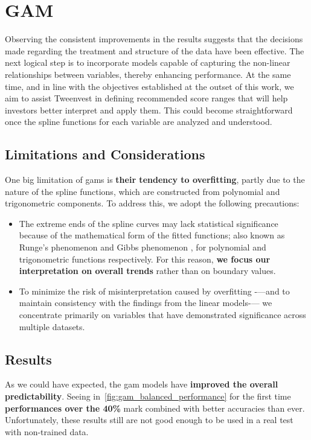 \documentclass[11pt,english,a4paper,hidelinks]{book}
\begin{document}

\section{GAM}

Observing the consistent improvements in the results suggests that the decisions made regarding the treatment and structure of the data have been effective. The next logical step is to incorporate models capable of capturing the non-linear relationships between variables, thereby enhancing performance. At the same time, and in line with the objectives established at the outset of this work, we aim to assist Tweenvest in defining recommended score ranges that will help investors better interpret and apply them. This could become straightforward once the spline functions for each variable are analyzed and understood.

\subsection{Limitations and Considerations}

\noindent One big limitation of \acrshort{gam}s is \textbf{their tendency to overfitting}, partly due to the nature of the spline functions, which are constructed from polynomial and trigonometric components. To address this, we adopt the following precautions:
\begin{itemize}
    \item The extreme ends of the spline curves may lack statistical significance because of the mathematical form of the fitted functions; also known as Runge's phenomenon \cite{runge1901empirische} and Gibbs phenomenon \cite{carslaw1930fourier}, for polynomial and trigonometric functions respectively. For this reason, \textbf{we focus our interpretation on overall trends} rather than on boundary values.
    \item To minimize the risk of misinterpretation caused by overfitting -—and to maintain consistency with the findings from the linear models-— we concentrate primarily on variables that have demonstrated significance across multiple datasets.
\end{itemize}

\subsection{Results}

\noindent As we could have expected, the \acrshort{gam} models have \textbf{improved the overall predictability}. Seeing in~\ref{fig:gam_balanced_performance} for the first time \textbf{performances over the 40\%} mark combined with better accuracies than ever. Unfortunately, these results still are not good enough to be used in a real test with non-trained data.
\end{document}
